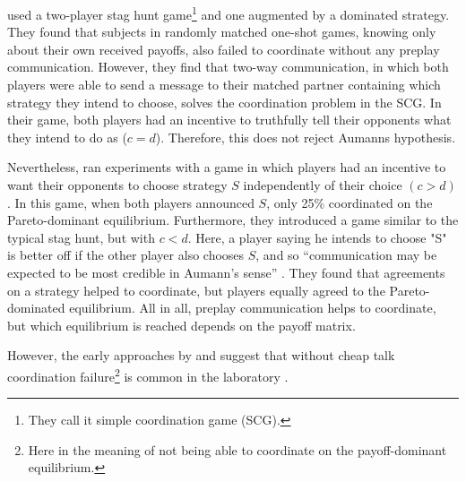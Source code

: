 \textcite{cooper_communication_1992} used a
two-player stag hunt game\footnote{They call 
it simple coordination game (SCG).}  
and one augmented by a dominated strategy. They found that 
subjects in randomly matched one-shot games, knowing only about their own
received payoffs, also failed to coordinate without any preplay communication. 
However, they find that two-way communication, in which both players were
able to send a message to their matched partner containing which strategy
they intend to choose, solves the coordination problem in the SCG. 
In their game, both players had an incentive to truthfully tell their
opponents what they intend to do as ($c=d$). 
Therefore, this does not reject Aumanns hypothesis.

Nevertheless, \textcite{clark_when_2001} ran experiments with a game in which
players had an incentive to want their opponents to choose strategy $S$ 
independently of their choice $(c > d)$.
In this game, when both players announced $S$, only 25\% coordinated on
the Pareto-dominant equilibrium. Furthermore, they introduced a game
similar to the typical stag hunt, but with $c<d$. Here, a player saying he 
intends to choose "S" is better off if the other player also chooses $S$, and
so ``communication may be expected to be most credible in Aumann's sense'' 
\parencite[508]{clark_when_2001}. They found that agreements on a strategy
helped to coordinate, but players equally agreed to the Pareto-dominated
equilibrium. 
All in all, preplay communication helps to coordinate, but which
equilibrium is reached depends on the payoff matrix.

However, the 
early approaches by \textcite{cooper_communication_1992} and
\textcite{van_huyck_tacit_1990} suggest that without cheap talk 
coordination failure\footnote{Here in the meaning of not being able to coordinate on the payoff-dominant equilibrium.} 
is common in the laboratory \parencite[2]{devetag_when_2007}. 

